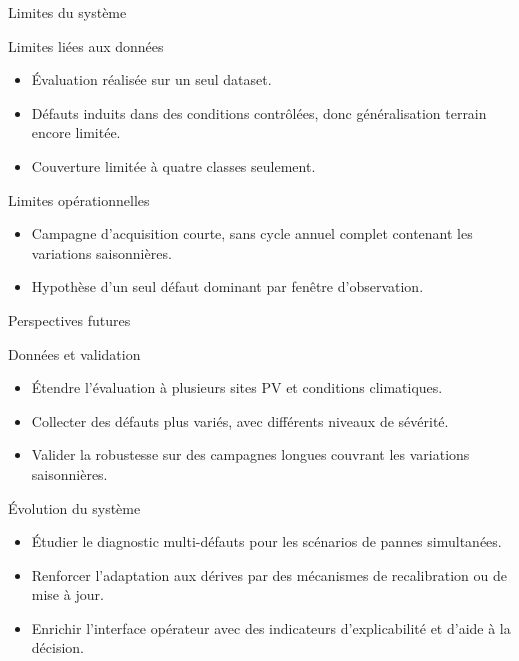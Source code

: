 \documentclass[10pt,aspectratio=169]{beamer}
\begin{document}
\begin{frame}{Limites du système}

\begin{block}{Limites liées aux données}
\begin{itemize}
  \item Évaluation réalisée sur un seul dataset.
  \item Défauts induits dans des conditions contrôlées, donc généralisation terrain encore limitée.
  \item Couverture limitée à quatre classes seulement.
\end{itemize}
\end{block}

\vspace{0.25cm}

\begin{block}{Limites opérationnelles}
\begin{itemize}
  \item Campagne d'acquisition courte, sans cycle annuel complet contenant les variations saisonnières.
  \item Hypothèse d'un seul défaut dominant par fenêtre d'observation.
\end{itemize}
\end{block}

\end{frame}


\begin{frame}{Perspectives futures}

\begin{block}{Données et validation}
\begin{itemize}
  \item Étendre l'évaluation à plusieurs sites PV et conditions climatiques.
  \item Collecter des défauts plus variés, avec différents niveaux de sévérité.
  \item Valider la robustesse sur des campagnes longues couvrant les variations saisonnières.
\end{itemize}
\end{block}

\vspace{0.25cm}

\begin{block}{Évolution du système}
\begin{itemize}
  \item Étudier le diagnostic multi-défauts pour les scénarios de pannes simultanées.
  \item Renforcer l'adaptation aux dérives par des mécanismes de recalibration ou de mise à jour.
  \item Enrichir l'interface opérateur avec des indicateurs d'explicabilité et d'aide à la décision.
\end{itemize}
\end{block}

\end{frame}
\end{document}
